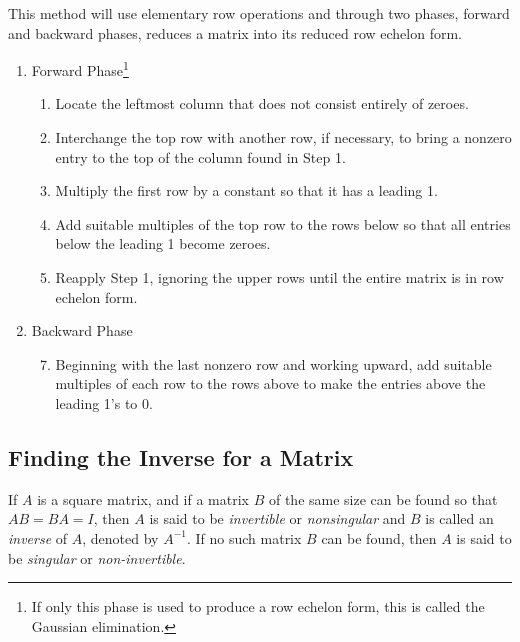 \documentclass{report}
\begin{document}
		\begin{mthd}\label{mthd_gauss_jordan_elim}
			This method will use elementary row operations and through two phases, forward and backward phases, reduces a matrix into its reduced row echelon form.
			\begin{enumerate}[label=Phase \arabic*.]
				\item Forward Phase\footnote{If only this phase is used to produce a row echelon form, this is called the Gaussian elimination.}
				\begin{enumerate}[label=Step \arabic*.]
					\item Locate the leftmost column that does not consist entirely of zeroes.
					\item Interchange the top row with another row, if necessary, to bring a nonzero entry to the top of the column found in Step 1.
					\item Multiply the first row by a constant so that it has a leading 1.
					\item Add suitable multiples of the top row to the rows below so that all entries below the leading 1 become zeroes.
					\item Reapply Step 1, ignoring the upper rows until the entire matrix is in row echelon form.
				\end{enumerate}
				\item Backward Phase
				\begin{enumerate}[label=Step \arabic*.]
					\setcounter{enumii}{6}
					\item Beginning with the last nonzero row and working upward, add suitable multiples of each row to the rows above to make the entries above the leading 1's to 0.
				\end{enumerate}
			\end{enumerate}
		\end{mthd}
		
		\subsection{Finding the Inverse for a Matrix}
		\begin{defn}[Inverse]\label{def_invertible_matrix}
			If $A$ is a square matrix, and if a matrix $B$ of the same size can be found so that $AB=BA=I$, then $A$ is said to be \emph{invertible} or \emph{nonsingular} and $B$ is called an \emph{inverse} of $A$, denoted by $A^{-1}$. If no such matrix $B$ can be found, then $A$ is said to be \emph{singular} or \emph{non-invertible}.
		\end{defn}
		
\end{document}
